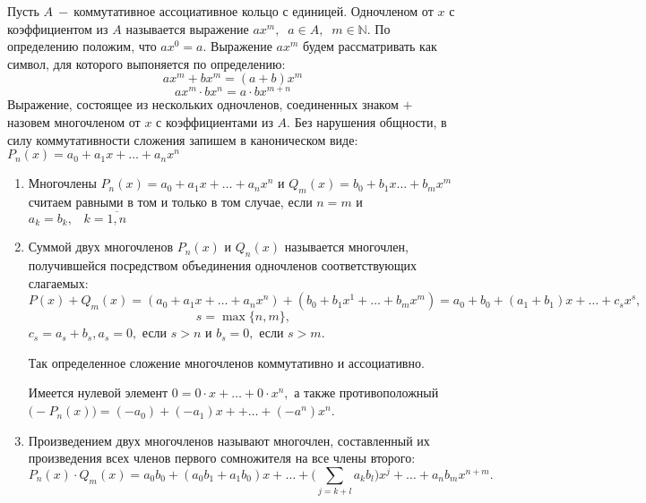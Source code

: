 Пусть $A~-~$коммутативное ассоциативное кольцо с единицей. Одночленом от $x$ с коэффициентом из $A$ называется выражение $ax^m, \;\;a\in A, \;\;m\in \mathbb{N}$. По определению положим, что $ax^0=a$. Выражение $ax^m$ будем рассматривать как символ, для которого выпоняется по определению: $$ax^m+bx^m=(a+b)x^m$$
$$ax^m\cdot bx^n= a \cdot b x^{m+n}$$
Выражение, состоящее из нескольких одночленов, соединенных знаком $+$ назовем многочленом от $x$ с коэффициентами из $A$. Без нарушения общности, в силу коммутативности сложения запишем в каноническом виде: $P_n(x)=a_0+a_1x+\dots+a_nx^n$
\begin{enumerate}
    \item\label{1} Многочлены $P_n(x)=a_0+a_1x+\dots+a_nx^n$ и $Q_m(x)=b_0+b_1x\dots+b_mx^m $ считаем равными в том и только в том случае,  если $n=m$ и $a_k=b_k, \;\;\;k=\overline{1, n}$
    
    \item Суммой двух многочленов $P_n(x)$ и $Q_n(x)$ называется многочлен, получившейся посредством объединения одночленов соответствующих слагаемых:$$P(x)+Q_m(x)=(a_0+a_1x+\dots+a_nx^n)+(b_0+b_1x^1+\dots+b_mx^m)=a_0+b_0+ (a_1+b_1)x+\dots+c_sx^s,$$ 
    $$s=\max\{n, m\},$$
    $c_s=a_s+b_s, a_s=0, $ если $s>n$ и $b_s=0, $ если $s>m$.\par 
    Так определенное сложение многочленов коммутативно и ассоциативно.\par 
    Имеется нулевой элемент $0=0 \cdot x + \dots + 0 \cdot x^n, $ а также противоположный $\big(-P_n(x)\big)=(-a_0)+(-a_1)x++\dots+(-a^n)x^n$.
    
    \item Произведением двух многочленов называют многочлен, составленный их произведения всех членов первого сомножителя на все члены второго:
    $$P_n(x)\cdot Q_m(x)=a_0b_0+(a_0b_1+a_1b_0)x+\dots+\Big(\displaystyle\sum_{j=k+l}a_kb_l \Big)x^j+\dots+a_nb_mx^{n+m}.$$
\end{enumerate}

